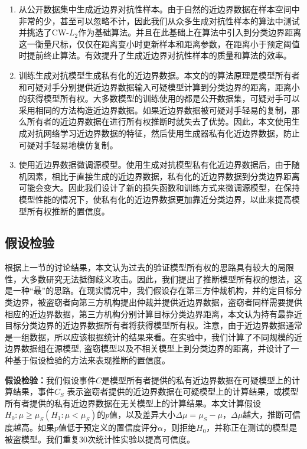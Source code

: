 \begin{enumerate}
	\renewcommand{\labelenumi}{\theenumi)}
	\item 从公开数据集中生成近边界对抗性样本。由于自然的近边界数据在样本空间中非常的少，甚至可以忽略不计，因此我们从众多生成对抗性样本的算法中测试并挑选了CW-$L_2$作为基础算法。并且在此基础上在算法中引入到分类边界距离这一衡量尺标，仅仅在距离变小时更新样本和距离参数，在距离小于预定阈值时提前终止算法。有效提升了生成近边界对抗性样本的质量和算法的效率。
	\item 训练生成对抗模型生成私有化的近边界数据。本文的的算法原理是模型所有者和可疑对手分别提供近边界数据输入可疑模型计算到分类边界的距离，距离小的获得模型所有权。大多数模型的训练使用的都是公开数据集，可疑对手可以采用相同的方法构造近边界数据。如果近边界数据被可疑对手轻易的复制，那么所有者的近边界数据在进行所有权推断时就失去了优势。因此，本文使用生成对抗网络学习近边界数据的特征，然后使用生成器私有化近边界数据，防止可疑对手轻易地模仿复制。
	\item 使用近边界数据微调源模型。使用生成对抗模型私有化近边界数据后，由于随机因素，相比于直接生成的近边界数据，私有化的近边界数据到分类边界距离可能会变大。因此我们设计了新的损失函数和训练方式来微调源模型，在保持模型性能的情况下，使私有化的近边界数据更加靠近分类边界，以此来提高模型所有权推断的置信度。
\end{enumerate}

\subsection{假设检验}\label{4.2.3}

根据上一节的讨论结果，本文认为过去的验证模型所有权的思路具有较大的局限性，大多数研究无法抵御歧义攻击。因此，我们提出了推断模型所有权的想法，这是一种“最”的思路。在现实情况中，我们假设存在第三方仲裁机构，并约定目标分类边界，被盗窃者向第三方机构提出仲裁并提供近边界数据，盗窃者同样需要提供相应的近边界数据，第三方机构分别计算目标分类边界距离，本文认为持有最靠近目标分类边界的近边界数据所有者将获得模型所有权。注意，由于近边界数据通常是一组数据，所以应该根据统计的结果来看。在实验中，我们计算了不同规模的近边界数据组在源模型, 盗窃模型以及不相关模型上到分类边界的距离，并设计了一种基于假设检验的方法来表现推断的置信度。

\noindent\textbf{假设检验：}我们假设事件$C$是模型所有者提供的私有近边界数据在可疑模型上的计算结果，事件$C_S$ 表示盗窃者提供的近边界数据在可疑模型上的计算结果，或模型所有者提供的私有近边界数据在无关模型上的计算结果。本文计算假设$H_0:\mu \geq \mu_S(H_1:\mu < \mu_S)$的$p$值，以及差异大小$\Delta \mu = \mu_S - \mu$，$\Delta\mu$越大，推断可信度越高。如果$p$值低于预定义的置信度评分$\alpha$，则拒绝$H_0$，并称正在测试的模型是被盗模型。我们重复30次统计性实验以提高可信度。


